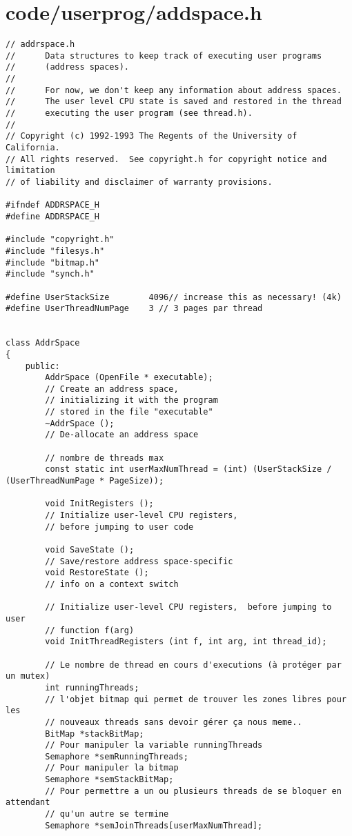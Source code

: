 \documentclass[a4paper,10pt]{article}
\begin{document}
\section{code/userprog/addspace.h}
\begin{lstlisting}
// addrspace.h
//      Data structures to keep track of executing user programs
//      (address spaces).
//
//      For now, we don't keep any information about address spaces.
//      The user level CPU state is saved and restored in the thread
//      executing the user program (see thread.h).
//
// Copyright (c) 1992-1993 The Regents of the University of California.
// All rights reserved.  See copyright.h for copyright notice and limitation
// of liability and disclaimer of warranty provisions.

#ifndef ADDRSPACE_H
#define ADDRSPACE_H

#include "copyright.h"
#include "filesys.h"
#include "bitmap.h"
#include "synch.h"

#define UserStackSize        4096// increase this as necessary! (4k)
#define UserThreadNumPage    3 // 3 pages par thread


class AddrSpace
{
    public:
        AddrSpace (OpenFile * executable);
        // Create an address space,
        // initializing it with the program
        // stored in the file "executable"
        ~AddrSpace ();
        // De-allocate an address space

        // nombre de threads max
        const static int userMaxNumThread = (int) (UserStackSize / (UserThreadNumPage * PageSize));

        void InitRegisters ();
        // Initialize user-level CPU registers,
        // before jumping to user code

        void SaveState ();
        // Save/restore address space-specific
        void RestoreState ();
        // info on a context switch

        // Initialize user-level CPU registers,  before jumping to user
        // function f(arg)
        void InitThreadRegisters (int f, int arg, int thread_id);

        // Le nombre de thread en cours d'executions (à protéger par un mutex)
        int runningThreads;
        // l'objet bitmap qui permet de trouver les zones libres pour les
        // nouveaux threads sans devoir gérer ça nous meme..
        BitMap *stackBitMap;
        // Pour manipuler la variable runningThreads
        Semaphore *semRunningThreads;
        // Pour manipuler la bitmap
        Semaphore *semStackBitMap;
        // Pour permettre a un ou plusieurs threads de se bloquer en attendant
        // qu'un autre se termine
        Semaphore *semJoinThreads[userMaxNumThread];


\end{lstlisting}
\end{document}
